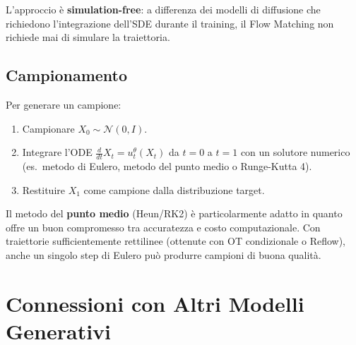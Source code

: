 L'approccio è \textbf{simulation-free}: a differenza dei modelli di
diffusione che richiedono l'integrazione dell'SDE durante il training,
il Flow Matching non richiede mai di simulare la traiettoria.

\subsection{Campionamento}
\label{subsec:fm-sampling}

Per generare un campione:
\begin{enumerate}
  \item Campionare $X_0 \sim \mathcal{N}(0, I)$.
  \item Integrare l'ODE $\frac{d}{dt}X_t = u_t^\theta(X_t)$
        da $t=0$ a $t=1$ con un solutore numerico
        (es.\ metodo di Eulero, metodo del punto medio o Runge-Kutta 4).
  \item Restituire $X_1$ come campione dalla distribuzione target.
\end{enumerate}

Il metodo del \textbf{punto medio} (Heun/RK2) è particolarmente adatto
in quanto offre un buon compromesso tra accuratezza e costo computazionale.
Con traiettorie sufficientemente rettilinee (ottenute con OT condizionale
o Reflow), anche un singolo step di Eulero può produrre campioni di
buona qualità.

\section{Connessioni con Altri Modelli Generativi}
\label{sec:fm-connections}

\begin{table}[H]
  \centering
  \caption{Confronto tra Flow Matching, modelli di diffusione e approcci
           diretti. FM = Flow Matching, DDPM = Denoising Diffusion
           Probabilistic Model, DDIM = Denoising Diffusion Implicit Model,
           OT-CFM = Conditional OT Flow Matching.}
  \label{tab:fm-comparison}
  \small
\end{table}

